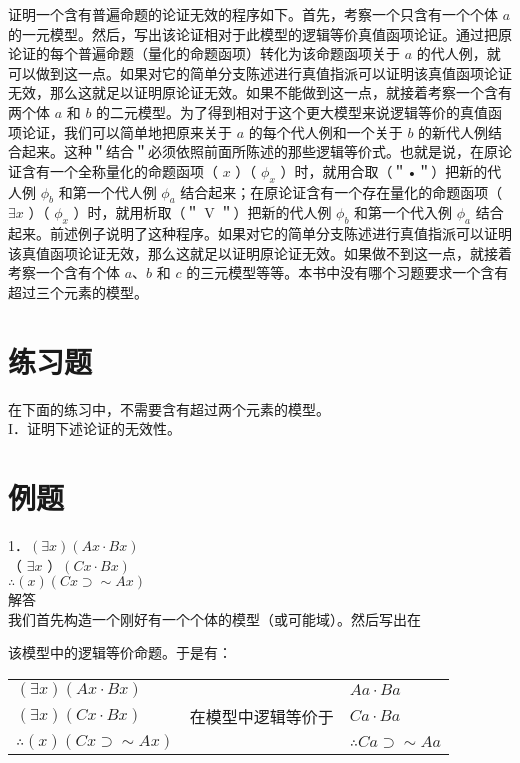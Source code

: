 证明一个含有普遍命题的论证无效的程序如下。首先，考察一个只含有一个个体 $a$ 的一元模型。然后，写出该论证相对于此模型的逻辑等价真值函项论证。通过把原论证的每个普遍命题（量化的命题函项）转化为该命题函项关于 $a$ 的代人例，就可以做到这一点。如果对它的简单分支陈述进行真值指派可以证明该真值函项论证无效，那么这就足以证明原论证无效。如果不能做到这一点，就接着考察一个含有两个体 $a$ 和 $b$ 的二元模型。为了得到相对于这个更大模型来说逻辑等价的真值函项论证，我们可以简单地把原来关于 $a$ 的每个代人例和一个关于 $b$ 的新代人例结合起来。这种＂结合＂必须依照前面所陈述的那些逻辑等价式。也就是说，在原论证含有一个全称量化的命题函项（ $x$ ）（ $\phi_{x}$ ）时，就用合取（＂•＂）把新的代人例 $\phi_{b}$ 和第一个代人例 $\phi_{a}$ 结合起来；在原论证含有一个存在量化的命题函项（ $\exists x$ ）（ $\phi_{x}$ ）时，就用析取（＂ V ＂）把新的代人例 $\phi_{b}$ 和第一个代入例 $\phi_{a}$ 结合起来。前述例子说明了这种程序。如果对它的简单分支陈述进行真值指派可以证明该真值函项论证无效，那么这就足以证明原论证无效。如果做不到这一点，就接着考察一个含有个体 $a 、 b$ 和 $c$ 的三元模型等等。本书中没有哪个习题要求一个含有超过三个元素的模型。

\section*{练习题}
在下面的练习中，不需要含有超过两个元素的模型。\\
I．证明下述论证的无效性。

\section*{例题}
1．$(\exists x)(A x \cdot B x)$\\
（ $\exists x$ ）$(C x \cdot B x)$\\
$\therefore(x)(C x \supset \sim A x)$\\
解答\\
我们首先构造一个刚好有一个个体的模型（或可能域）。然后写出在

该模型中的逻辑等价命题。于是有：

\begin{center}
\begin{tabular}{lll}
$(\exists x)(A x \cdot B x)$ &  & $A a \cdot B a$ \\
$(\exists x)(C x \cdot B x)$ & 在模型中逻辑等价于 & $C a \cdot B a$ \\
$\therefore(x)(C x \supset \sim A x)$ &  & $\therefore C a \supset \sim A a$ \\
\end{tabular}
\end{center}

